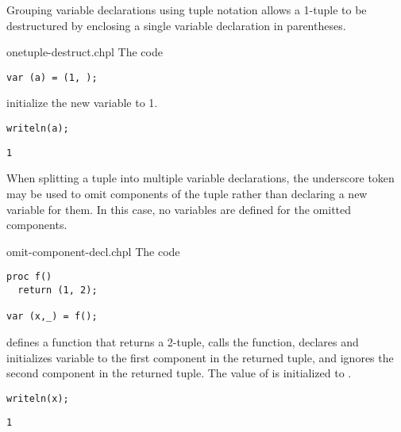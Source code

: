 Grouping variable declarations using tuple notation allows a 1-tuple
to be destructured by enclosing a single variable declaration in
parentheses.
\begin{chapelexample}{onetuple-destruct.chpl}
The code
\begin{chapel}
\begin{verbatim}
var (a) = (1, );
\end{verbatim}
\end{chapel}
initialize the new variable  to 1.
\begin{chapelpost}
\begin{verbatim}
writeln(a);
\end{verbatim}
\end{chapelpost}
\begin{chapeloutput}
\begin{verbatim}
1
\end{verbatim}
\end{chapeloutput}
\end{chapelexample}

When splitting a tuple into multiple variable declarations, the
underscore token may be used to omit components of the tuple rather
than declaring a new variable for them.  In this case, no variables
are defined for the omitted components.

\begin{chapelexample}{omit-component-decl.chpl}
The code
\begin{chapel}
\begin{verbatim}
proc f()
  return (1, 2);

var (x,_) = f();
\end{verbatim}
\end{chapel}
defines a function that returns a 2-tuple, calls the function,
declares and initializes variable  to the first component in
the returned tuple, and ignores the second component in the returned
tuple.  The value of  is initialized to .
\begin{chapelpost}
\begin{verbatim}
writeln(x);
\end{verbatim}
\end{chapelpost}
\begin{chapeloutput}
\begin{verbatim}
1
\end{verbatim}
\end{chapeloutput}
\end{chapelexample}

